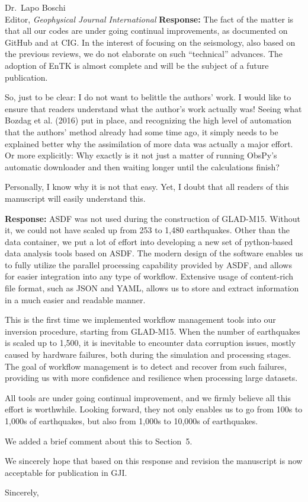\documentclass[11pt,a4paper]{letter}
\newcommand{\response}[1]{\textbf{Response:} #1}
\newcommand{\rev}[1]{{\it{#1}}}
\begin{document}
\begin{letter}{Dr.~Lapo Boschi\\
Editor, \textit{Geophysical Journal International}}
\response{
The fact of the matter is that all our codes are under going continual improvements, as documented on GitHub and at CIG.
In the interest of focusing on the seismology,
also based on the previous reviews, we do not elaborate on such ``technical'' advances.
The adoption of EnTK is almost complete and will be the subject of a future publication.
}

\rev{
So, just to be clear: I do not want to belittle the authors' work. I would like to ensure that readers understand what the author's work actually was! Seeing what Bozdag et al. (2016) put in place, and recognizing the high level of automation that the authors' method already had some time ago, it simply needs to be explained better why the assimilation of more data was actually a major effort. Or more explicitly: Why exactly is it not just a matter of running ObsPy's automatic downloader and then waiting longer until the calculations finish? 

Personally, I know why it is not that easy. Yet, I doubt that all readers of this manuscript will easily understand this.
}

\response{
ASDF was not used during the construction of GLAD-M15.
Without it, we could not have scaled up from 253 to 1,480 earthquakes.
Other than the data container,
we put a lot of effort into developing a new set of python-based data analysis tools based on ASDF.
The modern design of the software enables us to fully utilize the parallel processing capability provided by ASDF, and allows for easier integration into any type of workflow.
Extensive usage of content-rich file format, such as JSON and YAML, allows us to store and extract information in a much easier and readable manner.

This is the first time we implemented workflow management tools into our inversion procedure,
starting from GLAD-M15.
When the number of earthquakes is scaled up to 1,500, it is inevitable to encounter data corruption issues, mostly caused by hardware failures,
both during the simulation and processing stages.
The goal of workflow management is to detect and recover from such failures, providing us with more confidence and resilience when processing large datasets.

All tools are under going continual improvement,
and we firmly believe all this effort is worthwhile.
Looking forward, they not only enables us to go from 100s to 1,000s of earthquakes, but also from 1,000s to 10,000s of earthquakes.

We added a brief comment about this to Section~5.
}

We sincerely hope that based on this response and revision the manuscript is now acceptable for publication in GJI.

\closing{Sincerely,}

\end{letter} 
\end{document}
